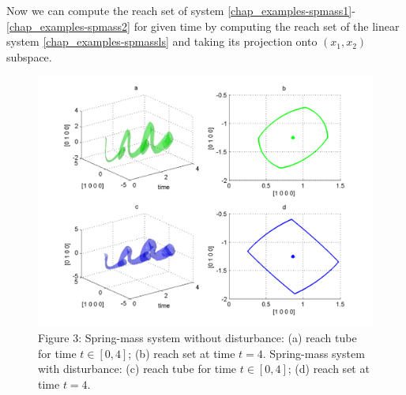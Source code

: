 \documentclass[letterpaper,10pt,english]{sphinxmanual}
\begin{document}
Now we can compute the reach set of system \eqref{chap_examples-spmass1}-\eqref{chap_examples-spmass2} for
given time by computing the reach set of the linear system \eqref{chap_examples-spmassls}
and taking its projection onto \((x_1, x_2)\) subspace.
\begin{figure}[htbp]
\centering
\capstart

\includegraphics[width=0.700\linewidth]{chapter06_section02_reachmech.png}
\caption{Figure 3: Spring-mass system without disturbance:
(a) reach tube for time \(t\in[0,4]\); (b) reach set at time \(t=4\).
Spring-mass system with disturbance:
(c) reach tube for time \(t\in[0,4]\); (d) reach set at time \(t=4\).}\label{chap_examples:mechreachfig}\end{figure}
\end{document}
